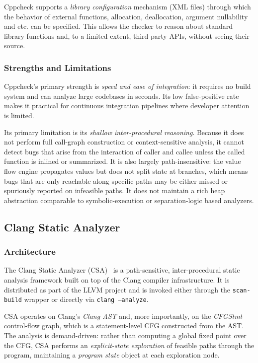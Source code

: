 \documentclass[11pt,a4paper]{article}
\begin{document}
Cppcheck supports a \emph{library configuration} mechanism (XML files) through which the behavior of external functions, allocation, deallocation, argument nullability and etc. can be specified. This allows the checker to reason about standard library functions and, to a limited extent, third-party APIs, without seeing their source.

\subsubsection{Strengths and Limitations}

Cppcheck's primary strength is \emph{speed and ease of integration}: it requires no build system and can analyze large codebases in seconds. Its low false-positive rate makes it practical for continuous integration pipelines where developer attention is limited.

Its primary limitation is its \emph{shallow inter-procedural reasoning}. Because it does not perform full call-graph construction or context-sensitive analysis, it cannot detect bugs that arise from the interaction of caller and callee unless the called function is inlined or summarized. It is also largely path-insensitive: the value flow engine propagates values but does not split state at branches, which means bugs that are only reachable along specific paths may be either missed or spuriously reported on infeasible paths. It does not maintain a rich heap abstraction comparable to symbolic-execution or separation-logic based analyzers.

\subsection{Clang Static Analyzer} 

\subsubsection{Architecture}

The Clang Static Analyzer (CSA)~\cite{clangsa} is a path-sensitive, inter-procedural static analysis framework built on top of the Clang compiler infrastructure. It is distributed as part of the LLVM project and is invoked either through the \texttt{scan-build} wrapper or directly via \texttt{clang --analyze}.

CSA operates on Clang's \emph{Clang AST} and, more importantly, on the \emph{CFGStmt} control-flow graph, which is a statement-level CFG constructed from the AST. The analysis is demand-driven: rather than computing a global fixed point over the CFG, CSA performs an \emph{explicit-state exploration} of feasible paths through the program, maintaining a \emph{program state} object at each exploration node.
\end{document}
